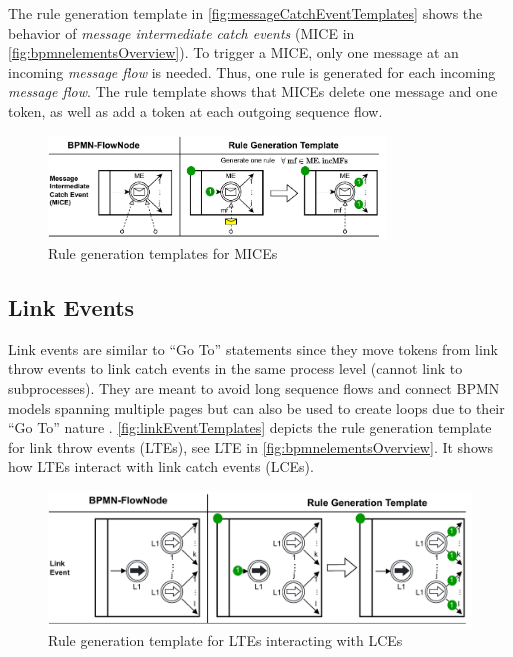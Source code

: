 \documentclass{lmcs} %
\begin{document}
The rule generation template in \autoref{fig:messageCatchEventTemplates} shows the behavior of \textit{message intermediate catch events} (\textsf{MICE} in \autoref{fig:bpmnelementsOverview}).
To trigger a MICE, only one message at an incoming \textit{message flow} is needed.
Thus, one rule is generated for each incoming \textit{message flow}.
The rule template shows that MICEs delete one message and one token, as well as add a token at each outgoing sequence flow.

\begin{figure}[ht]
    \centering
    \includegraphics[width=0.8\textwidth]{images/mice_template.pdf}
    \caption{Rule generation templates for MICEs}
    \label{fig:messageCatchEventTemplates}
\end{figure}


\subsection{Link Events} \label{subsec:signalEvents}
Link events are similar to \enquote{Go To} statements since they move tokens from link throw events to link catch events in the same process level (cannot link to subprocesses).
They are meant to avoid long sequence flows and connect BPMN models spanning multiple pages but can also be used to create loops due to their \enquote{Go To} nature \cite{objectmanagementgroupBusinessProcessModel2013}.
\autoref{fig:linkEventTemplates} depicts the rule generation template for link throw events (LTEs), see \textsf{LTE} in \autoref{fig:bpmnelementsOverview}.
It shows how LTEs interact with link catch events (LCEs).

\begin{figure}[ht]
    \centering
    \includegraphics[width=1\textwidth]{images/linkEvent_template.pdf}
    \caption{Rule generation template for LTEs interacting with LCEs}
    \label{fig:linkEventTemplates}
\end{figure}
\end{document}
